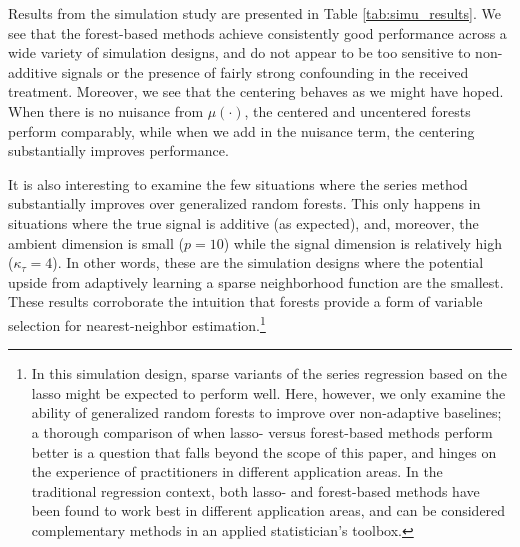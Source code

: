 \documentclass[aos]{imsart}
\theoremstyle{plain}
\theoremstyle{definition}
\theoremstyle{remark}
\begin{document}
\begin{CJK}{UTF8}{gbsn}
\begin{appendix}
\begin{table}[p]
\centering

\caption{Results from simulation study described in Appendix \ref{sec:bigsimu}, in terms of
mean-squared error for the treatment effect on a test set, i.e., $\mathbb{E}[(\htau(X) - \tau(X))^2]$,
where $X$ is a test example. The methods under
comparison are centered generalized random forests (C.~GRF), plain generalized random forests (GRF), series instrumental
variables regression, and the nearest neighbors method (kNN). The simulation specification varies by whether or not
the function $\mu(\cdot)$ in \eqref{eq:simu_design} is 0, whether all signals are additive (add.),
whether the received treatment $W$ is confounded (conf.), the signal dimension ($\kappa_\tau$),
the ambient dimension ($p$), and the sample size ($n$). All errors are aggregated over 100
runs of the simulation with 1,000 test points each, and all forests have $B = 2,000$ trees.}
\label{tab:simu_results}
\restoregeometry
\end{table}



Results from the simulation study are presented in Table \ref{tab:simu_results}.
We see that the forest-based methods achieve consistently good performance across a
wide variety of simulation designs, and do not appear to be too sensitive to non-additive signals
or the presence of fairly strong confounding in the received treatment. Moreover, we see that
the centering behaves as we might have hoped. When there is no nuisance from $\mu(\cdot)$,
the centered and uncentered forests perform comparably, while when we add in the nuisance
term, the centering substantially improves performance.

It is also interesting to examine the few situations where the series method
substantially improves over generalized random forests. This only happens in situations
where the true signal is additive (as expected),
and, moreover, the ambient dimension is small ($p = 10$) while the signal dimension is
relatively high ($\kappa_\tau = 4$). In other words, these are the simulation designs where the
potential upside from adaptively learning a sparse neighborhood function are the smallest.
These results corroborate the intuition that forests provide a form of variable selection for nearest-neighbor
estimation.\footnote{In this simulation design, sparse variants of the series regression based on the lasso
might be expected to perform well. Here, however, we only examine
the ability of generalized random forests to improve over non-adaptive baselines; a thorough comparison of when lasso- versus
forest-based methods perform better is a question that falls beyond the scope of this paper, and
hinges on the experience of practitioners in different application areas. In the traditional regression context,
both lasso- and forest-based methods have been found to work best in different application areas, and
can be considered complementary methods in an applied statistician's toolbox.}


\end{appendix}
\end{CJK}
\end{document}
